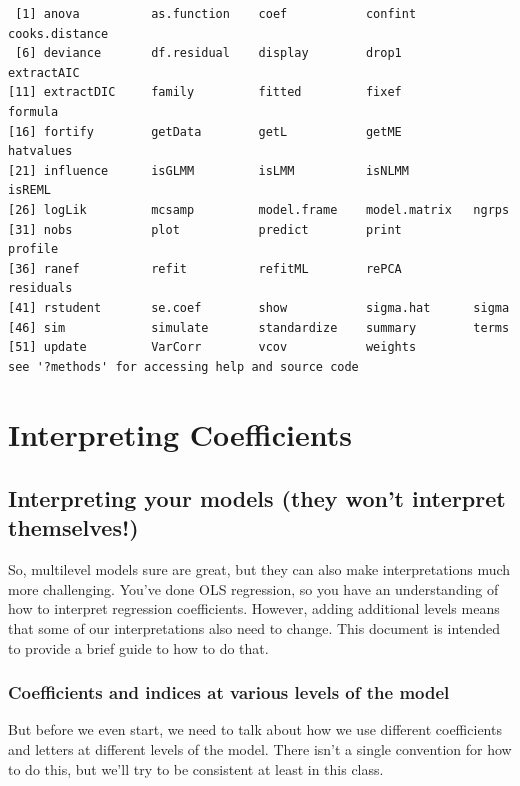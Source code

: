 \documentclass[
  letterpaper,
  DIV=11,
  numbers=noendperiod]{scrreprt}
\begin{document}
\begin{verbatim}
 [1] anova          as.function    coef           confint        cooks.distance
 [6] deviance       df.residual    display        drop1          extractAIC    
[11] extractDIC     family         fitted         fixef          formula       
[16] fortify        getData        getL           getME          hatvalues     
[21] influence      isGLMM         isLMM          isNLMM         isREML        
[26] logLik         mcsamp         model.frame    model.matrix   ngrps         
[31] nobs           plot           predict        print          profile       
[36] ranef          refit          refitML        rePCA          residuals     
[41] rstudent       se.coef        show           sigma.hat      sigma         
[46] sim            simulate       standardize    summary        terms         
[51] update         VarCorr        vcov           weights       
see '?methods' for accessing help and source code
\end{verbatim}

\chapter{Interpreting Coefficients}\label{interpreting-coefficients}

\section{Interpreting your models (they won't interpret
themselves!)}\label{interpreting-your-models-they-wont-interpret-themselves}

So, multilevel models sure are great, but they can also make
interpretations much more challenging. You've done OLS regression, so
you have an understanding of how to interpret regression coefficients.
However, adding additional levels means that some of our interpretations
also need to change. This document is intended to provide a brief guide
to how to do that.

\subsection*{Coefficients and indices at various levels of the
model}\label{coefficients-and-indices-at-various-levels-of-the-model}

But before we even start, we need to talk about how we use different
coefficients and letters at different levels of the model. There isn't a
single convention for how to do this, but we'll try to be consistent at
least in this class.
\end{document}

